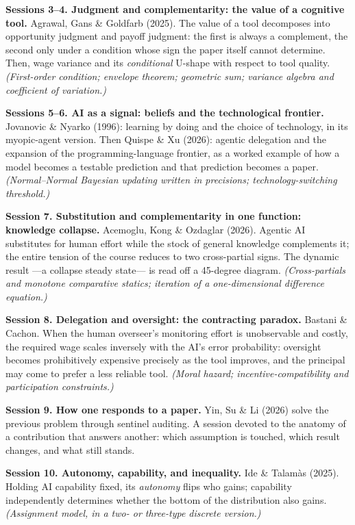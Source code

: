 \documentclass[11pt]{article}
\begin{document}
\textbf{Sessions 3--4. Judgment and complementarity: the value of a cognitive tool.}
Agrawal, Gans \& Goldfarb (2025). The value of a tool decomposes into opportunity judgment and payoff judgment: the first is always a complement, the second only under a condition whose sign the paper itself cannot determine. Then, wage variance and its \emph{conditional} U-shape with respect to tool quality.
\emph{(First-order condition; envelope theorem; geometric sum; variance algebra and coefficient of variation.)}

\textbf{Sessions 5--6. AI as a signal: beliefs and the technological frontier.}
Jovanovic \& Nyarko (1996): learning by doing and the choice of technology, in its myopic-agent version. Then Quispe \& Xu (2026): agentic delegation and the expansion of the programming-language frontier, as a worked example of how a model becomes a testable prediction and that prediction becomes a paper.
\emph{(Normal--Normal Bayesian updating written in precisions; technology-switching threshold.)}

\textbf{Session 7. Substitution and complementarity in one function: knowledge collapse.}
Acemoglu, Kong \& Ozdaglar (2026). Agentic AI substitutes for human effort while the stock of general knowledge complements it; the entire tension of the course reduces to two cross-partial signs. The dynamic result ---a collapse steady state--- is read off a 45-degree diagram.
\emph{(Cross-partials and monotone comparative statics; iteration of a one-dimensional difference equation.)}

\textbf{Session 8. Delegation and oversight: the contracting paradox.}
Bastani \& Cachon. When the human overseer's monitoring effort is unobservable and costly, the required wage scales inversely with the AI's error probability: oversight becomes prohibitively expensive precisely as the tool improves, and the principal may come to prefer a less reliable tool.
\emph{(Moral hazard; incentive-compatibility and participation constraints.)}

\textbf{Session 9. How one responds to a paper.}
Yin, Su \& Li (2026) solve the previous problem through sentinel auditing. A session devoted to the anatomy of a contribution that answers another: which assumption is touched, which result changes, and what still stands.

\textbf{Session 10. Autonomy, capability, and inequality.}
Ide \& Talam\`as (2025). Holding AI capability fixed, its \emph{autonomy} flips who gains; capability independently determines whether the bottom of the distribution also gains.
\emph{(Assignment model, in a two- or three-type discrete version.)}
\end{document}

